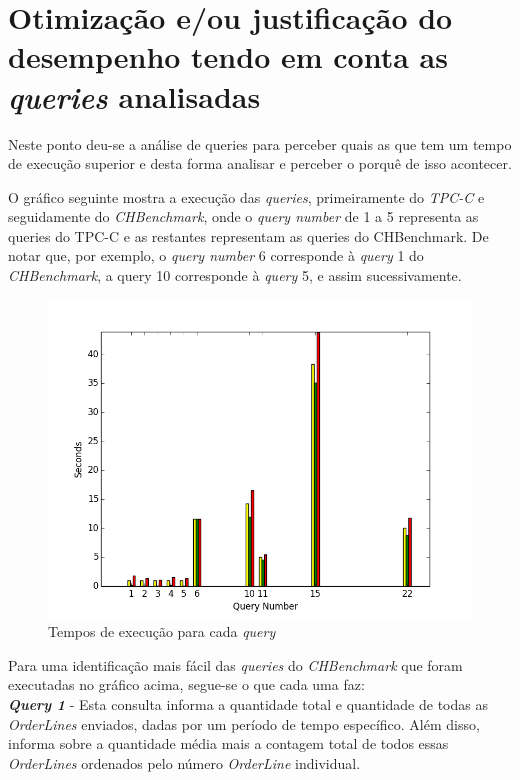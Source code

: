 \section{Otimização e/ou justificação do desempenho tendo em conta as \textit{queries} analisadas}

Neste ponto deu-se a análise de queries para perceber quais as que tem um tempo de execução superior e desta forma analisar e perceber o porquê de isso acontecer.

O gráfico seguinte mostra a execução das \textit{queries}, primeiramente do \textit{TPC-C} e seguidamente do \textit{CHBenchmark}, onde o \textit{query number} de 1 a 5 representa as queries do TPC-C e as restantes representam as queries do CHBenchmark. De notar que, por exemplo, o \textit{query number} 6 corresponde à \textit{query} 1 do \textit{CHBenchmark}, a query 10 corresponde à \textit{query} 5, e assim sucessivamente.

\begin{figure}[ht!]
\centering
\includegraphics[width=\textwidth]{img/00_conf_initial}
\caption{Tempos de execução para cada \textit{query} \label{overflow}}
\end{figure}

Para uma identificação mais fácil das \textit{queries} do \textit{CHBenchmark} que foram executadas no gráfico acima, segue-se o que cada uma faz:
\\

\textbf{\textit{Query 1}} - Esta consulta informa a quantidade total e quantidade de todas as \textit{OrderLines} enviados, dadas por um período de tempo específico. Além disso, informa sobre a quantidade média mais a contagem total de todos essas \textit{OrderLines} ordenados pelo número \textit{OrderLine} individual.

